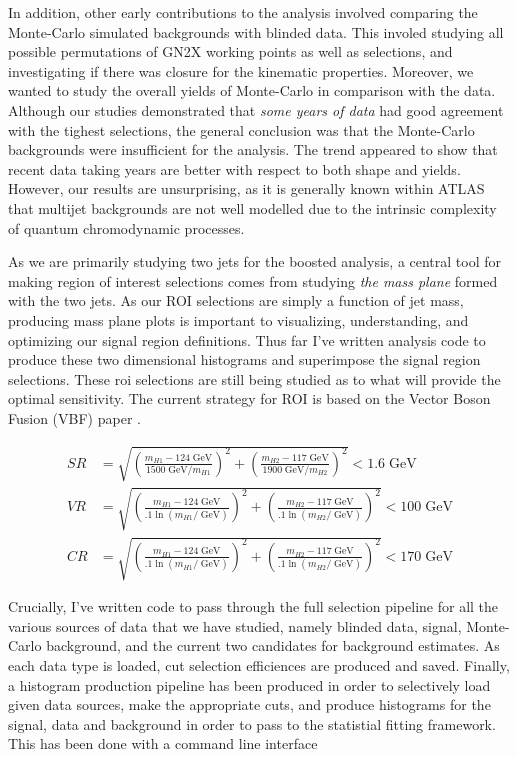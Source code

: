 \documentclass[12pt]{article}
\newcommand{\un}[1]{\;\text{#1}}
\begin{document}
In addition, other early contributions to the analysis involved comparing the
Monte-Carlo simulated backgrounds with blinded data. This involed studying all
possible permutations of GN2X working points as well as selections, and
investigating if there was closure for the kinematic properties. Moreover, we
wanted to study the overall yields of Monte-Carlo in comparison with the data. Although our
studies demonstrated that \textit{some years of data} had good agreement with
the tighest selections, the general conclusion was that the Monte-Carlo
backgrounds were insufficient for the analysis. The trend appeared to show that
recent data taking years are better with respect to both shape and yields.
However, our results are unsurprising, as it is generally known within ATLAS
that multijet backgrounds are not well modelled due to the intrinsic
complexity of quantum chromodynamic processes.

As we are primarily studying two jets for the boosted analysis, a central tool
for making region of interest selections comes from studying \textit{the mass
plane} formed with the two jets. As our ROI selections are simply a function of
jet mass, producing mass plane plots is important to visualizing, understanding,
and optimizing our signal region definitions. Thus far I've written analysis
code to produce these two dimensional histograms and superimpose the signal
region selections. These roi selections are still being studied as to what will
provide the optimal sensitivity. The current strategy for ROI is based on the
Vector Boson Fusion (VBF) paper
\cite{vbf_hh4b}.

\begin{align}
    SR &= \sqrt{\left( \frac{m_{H1}-124\;\text{GeV}}{1500\;\text{GeV}/m_{H1}}
    \right)^2 + \left( \frac{m_{H2}-117\;\text{GeV}}{1900\;\text{GeV}/m_{H2}}
    \right)^2} < 1.6 \un{GeV} \\
    VR &= \sqrt{\left( \frac{m_{H1}-124\;\text{GeV}}{.1\ln(m_{H1}/\;\text{GeV})}
    \right)^2 + \left( \frac{m_{H2}-117\;\text{GeV}}{.1\ln(m_{H2}/\;\text{GeV})}
    \right)^2} < 100 \un{GeV} \\
    CR &= \sqrt{\left( \frac{m_{H1}-124\;\text{GeV}}{.1\ln(m_{H1}/\;\text{GeV})}
    \right)^2 + \left( \frac{m_{H2}-117\;\text{GeV}}{.1\ln(m_{H2}/\;\text{GeV})}
    \right)^2} < 170 \un{GeV}
\end{align}

Crucially, I've written code to pass through the full selection pipeline for all
the various sources of data that we have studied, namely blinded data, signal,
Monte-Carlo background, and the current two candidates for background estimates.
As each data type is loaded, cut selection efficiences are produced and saved.
Finally, a histogram production pipeline has been produced in order to
selectively load given data sources, make the appropriate cuts, and produce
histograms for the signal, data and background in order to pass to the
statistial fitting framework. This has been done with a command line interface
\end{document}
